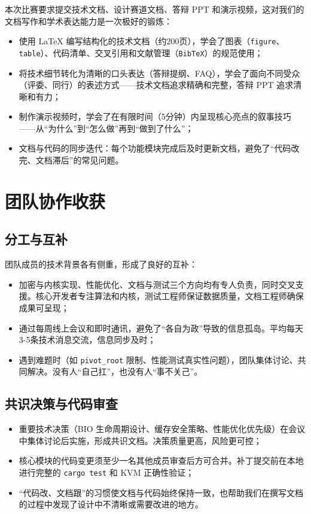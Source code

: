 本次比赛要求提交技术文档、设计赛道文档、答辩 PPT 和演示视频，这对我们的文档写作和学术表达能力是一次极好的锻炼：

\begin{itemize}
    \item 使用 LaTeX 编写结构化的技术文档（约200页），学会了图表（\texttt{figure}、\texttt{table}）、代码清单、交叉引用和文献管理（\texttt{BibTeX}）的规范使用；
    \item 将技术细节转化为清晰的口头表达（答辩提纲、FAQ），学会了面向不同受众（评委、同行）的表述方式——技术文档追求精确和完整，答辩 PPT 追求清晰和有力；
    \item 制作演示视频时，学会了在有限时间（5分钟）内呈现核心亮点的叙事技巧——从“为什么”到“怎么做”再到“做到了什么”；
    \item 文档与代码的同步迭代：每个功能模块完成后及时更新文档，避免了“代码改完、文档滞后”的常见问题。
\end{itemize}

\section{团队协作收获}

\subsection{分工与互补}

团队成员的技术背景各有侧重，形成了良好的互补：

\begin{itemize}
    \item 加密与内核实现、性能优化、文档与测试三个方向均有专人负责，同时交叉支援。核心开发者专注算法和内核，测试工程师保证数据质量，文档工程师确保成果可呈现；
    \item 通过每周线上会议和即时通讯，避免了“各自为政”导致的信息孤岛。平均每天3-5条技术消息交流，信息同步及时；
    \item 遇到难题时（如 \texttt{pivot\_root} 限制、性能测试真实性问题），团队集体讨论、共同解决。没有人“自己扛”，也没有人“事不关己”。
\end{itemize}

\subsection{共识决策与代码审查}

\begin{itemize}
    \item 重要技术决策（BIO 生命周期设计、缓存安全策略、性能优化优先级）在会议中集体讨论后实施，形成共识文档。决策质量更高，风险更可控；
    \item 核心模块的代码变更须至少一名其他成员审查后方可合并。补丁提交前在本地进行完整的 \texttt{cargo test} 和 KVM 正确性验证；
    \item “代码改、文档跟”的习惯使文档与代码始终保持一致，也帮助我们在撰写文档的过程中发现了设计中不清晰或需要改进的地方。
\end{itemize}

